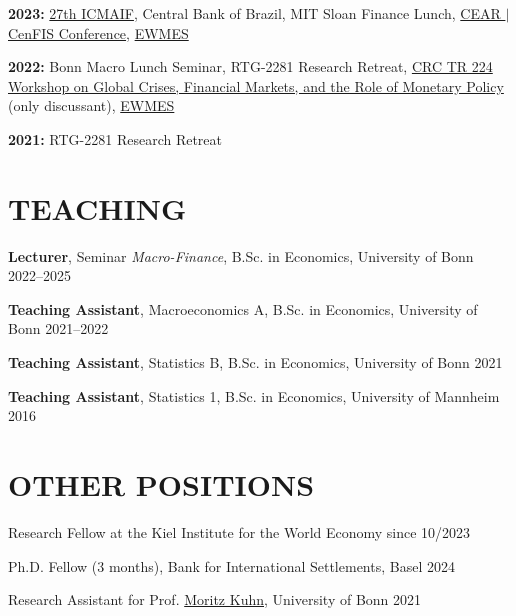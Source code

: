 \documentclass{res}
\begin{document}
\begin{resume}
    \textbf{2023:} 
    \href{https://icmaif.soc.uoc.gr/conference-program-2023/}{27th ICMAIF},
    Central Bank of Brazil,
    MIT Sloan Finance Lunch,
    \href{https://cear.gsu.edu/event-archives/interest-rate-variability-and-the-financial-sector/}{CEAR $|$ CenFIS Conference},
    \href{https://www.econometricsociety.org/regional-activities/schedule/2023/12/17/2023-EWMES-Manchester-United-Kingdom#home}{EWMES}
    
    \textbf{2022:} 
    Bonn Macro Lunch Seminar, %
    RTG-2281 Research Retreat,
    \href{https://www.vwl.uni-mannheim.de/news/crc-tr-224-workshop-on-global-crises-financial-markets-and-the-role-of-monetary-policy-08-09-december-2022/}{CRC TR 224 Workshop on Global Crises, Financial Markets, and the Role of Monetary Policy} (only discussant),
    \href{https://www.econometricsociety.org/regional-activities/schedule/2022/12/16/2022-European-Winter-Meeting-Berlin}{EWMES}
    
    \textbf{2021:} 
    RTG-2281 Research Retreat %

\section{TEACHING}
\vspace{0.05in}

  \textbf{Lecturer},
  Seminar \emph{Macro-Finance},
  B.Sc. in Economics, 
  University of Bonn 
  \hfill 2022--2025

  \textbf{Teaching Assistant},
  Macroeconomics A, 
  B.Sc. in Economics, 
  University of Bonn 
  \hfill 2021--2022

  \textbf{Teaching Assistant},
  Statistics B, 
  B.Sc. in Economics, 
  University of Bonn 
  \hfill 2021

  \textbf{Teaching Assistant},
  Statistics 1,
  B.Sc. in Economics, 
  University of Mannheim 
  \hfill 2016

\section{OTHER POSITIONS}
\vspace{0.05in}
    Research Fellow at the Kiel Institute for the World Economy \hfill since 10/2023

    Ph.D. Fellow (3 months), Bank for International Settlements, Basel \hfill 2024
    
    Research Assistant for Prof. \href{https://sites.google.com/site/kuhnecon/home}{Moritz Kuhn}, University of Bonn \hfill 2021
    

\end{resume}
\end{document}
